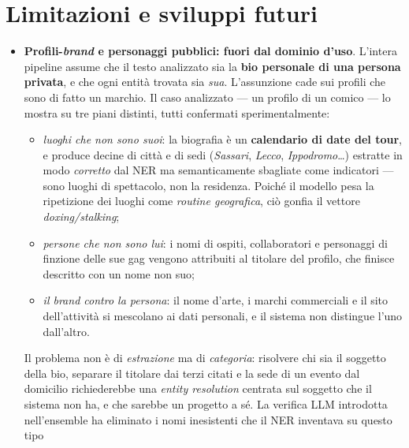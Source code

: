 \documentclass[11pt,a4paper]{article}
\begin{document}
\section{Limitazioni e sviluppi futuri}
\begin{itemize}[nosep]
  \item \textbf{Profili-\emph{brand} e personaggi pubblici: fuori dal dominio d'uso}.
        L'intera pipeline assume che il testo analizzato sia la \textbf{bio personale di
        una persona privata}, e che ogni entità trovata sia \emph{sua}. L'assunzione cade
        sui profili che sono di fatto un marchio. Il caso analizzato --- un profilo di un
        comico --- lo mostra su tre piani distinti, tutti confermati sperimentalmente:
        \begin{itemize}[nosep]
          \item \emph{luoghi che non sono suoi}: la biografia è un \textbf{calendario di
                date del tour}, e produce decine di città e di sedi (\emph{Sassari},
                \emph{Lecco}, \emph{Ippodromo}\ldots) estratte in modo \emph{corretto} dal
                NER ma semanticamente sbagliate come indicatori --- sono luoghi di
                spettacolo, non la residenza. Poiché il modello pesa la ripetizione dei
                luoghi come \emph{routine geografica}, ciò gonfia il vettore
                \emph{doxing/stalking};
          \item \emph{persone che non sono lui}: i nomi di ospiti, collaboratori e
                personaggi di finzione delle sue gag vengono attribuiti al titolare del
                profilo, che finisce descritto con un nome non suo;
          \item \emph{il brand contro la persona}: il nome d'arte, i marchi commerciali e
                il sito dell'attività si mescolano ai dati personali, e il sistema non
                distingue l'uno dall'altro.
        \end{itemize}
        Il problema non è di \emph{estrazione} ma di \emph{categoria}: risolvere chi sia il
        soggetto della bio, separare il titolare dai terzi citati e la sede di un evento
        dal domicilio richiederebbe una \emph{entity resolution} centrata sul soggetto che
        il sistema non ha, e che sarebbe un progetto a sé. La verifica LLM introdotta
        nell'ensemble ha eliminato i nomi inesistenti che il NER inventava su questo tipo

\end{itemize}
\end{document}
